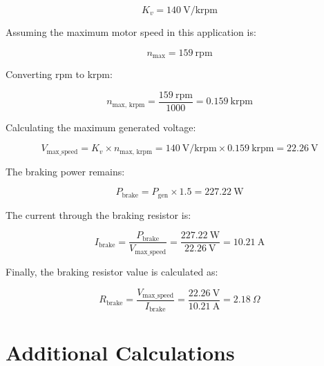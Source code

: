 \[
K_v = 140\ \text{V/krpm}
\]

Assuming the maximum motor speed in this application is:

\[
n_{\text{max}} = 159\ \text{rpm}
\]

Converting rpm to krpm:

\[
n_{\text{max, krpm}} = \frac{159\ \text{rpm}}{1000} = 0.159\ \text{krpm}
\]

Calculating the maximum generated voltage:

\[
V_{\text{max\_speed}} = K_v \times n_{\text{max, krpm}} = 140\ \text{V/krpm} \times 0.159\ \text{krpm} = 22.26\ \text{V}
\]

The braking power remains:

\[
P_{\text{brake}} = P_{\text{gen}} \times 1.5 = 227.22\ \text{W}
\]

The current through the braking resistor is:

\[
I_{\text{brake}} = \frac{P_{\text{brake}}}{V_{\text{max\_speed}}} = \frac{227.22\ \text{W}}{22.26\ \text{V}} = 10.21\ \text{A}
\]

Finally, the braking resistor value is calculated as:

\[
R_{\text{brake}} = \frac{V_{\text{max\_speed}}}{I_{\text{brake}}} = \frac{22.26\ \text{V}}{10.21\ \text{A}} = 2.18\ \Omega
\]



\chapter{Additional Calculations}

